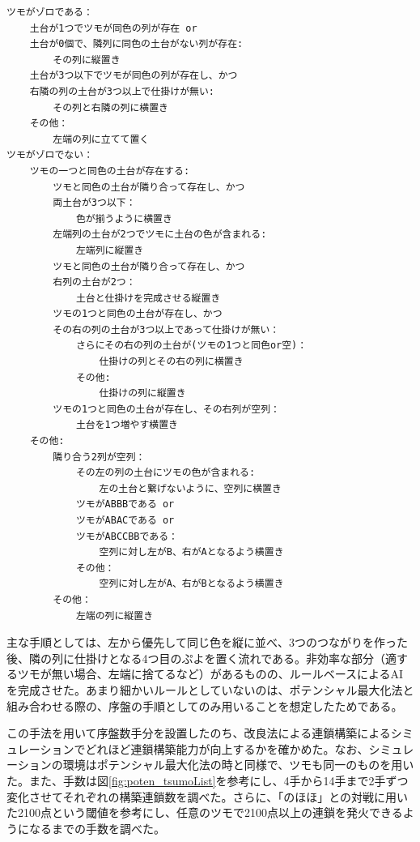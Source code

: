 \documentclass[12pt]{jreport}
\begin{document}
\begin{lstlisting}[basicstyle=\ttfamily\footnotesize, frame=single]
ツモがゾロである：
    土台が1つでツモが同色の列が存在 or
    土台が0個で、隣列に同色の土台がない列が存在:
        その列に縦置き
    土台が3つ以下でツモが同色の列が存在し、かつ
    右隣の列の土台が3つ以上で仕掛けが無い:
        その列と右隣の列に横置き
    その他：
        左端の列に立てて置く
ツモがゾロでない：
    ツモの一つと同色の土台が存在する:
        ツモと同色の土台が隣り合って存在し、かつ
        両土台が3つ以下：
            色が揃うように横置き
        左端列の土台が2つでツモに土台の色が含まれる:
            左端列に縦置き
        ツモと同色の土台が隣り合って存在し、かつ
        右列の土台が2つ：
            土台と仕掛けを完成させる縦置き
        ツモの1つと同色の土台が存在し、かつ
        その右の列の土台が3つ以上であって仕掛けが無い：
            さらにその右の列の土台が(ツモの1つと同色or空)：
                仕掛けの列とその右の列に横置き
            その他:
                仕掛けの列に縦置き
        ツモの1つと同色の土台が存在し、その右列が空列：
            土台を1つ増やす横置き
    その他:
        隣り合う2列が空列：
            その左の列の土台にツモの色が含まれる:
                左の土台と繋げないように、空列に横置き
            ツモがABBBである or
            ツモがABACである or
            ツモがABCCBBである：
                空列に対し左がB、右がAとなるよう横置き
            その他：
                空列に対し左がA、右がBとなるよう横置き
        その他：
            左端の列に縦置き
\end{lstlisting}

主な手順としては、左から優先して同じ色を縦に並べ、3つのつながりを作った後、隣の列に仕掛けとなる4つ目のぷよを置く流れである。非効率な部分（適するツモが無い場合、左端に捨てるなど）があるものの、ルールベースによるAIを完成させた。あまり細かいルールとしていないのは、ポテンシャル最大化法と組み合わせる際の、序盤の手順としてのみ用いることを想定したためである。

この手法を用いて序盤数手分を設置したのち、改良法による連鎖構築によるシミュレーションでどれほど連鎖構築能力が向上するかを確かめた。なお、シミュレーションの環境はポテンシャル最大化法の時と同様で、ツモも同一のものを用いた。また、手数は図\ref{fig:poten_tsumoList}を参考にし、4手から14手まで2手ずつ変化させてそれぞれの構築連鎖数を調べた。さらに、「のほほ」との対戦に用いた2100点という閾値を参考にし、任意のツモで2100点以上の連鎖を発火できるようになるまでの手数を調べた。
\end{document}
